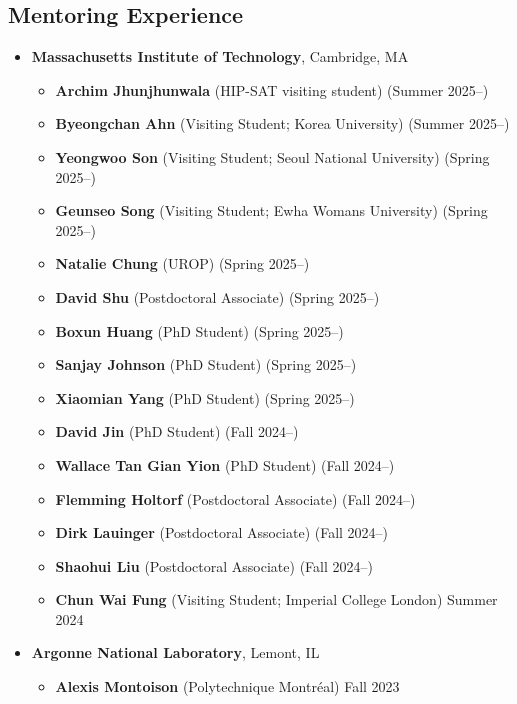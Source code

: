 \subsection*{Mentoring Experience}
\begin{itemize}[itemsep=1pt, parsep=0pt,leftmargin=*]
  \item[] \textbf{Massachusetts Institute of Technology}, Cambridge, MA
    \begin{itemize}[itemsep=1pt, parsep=0pt,leftmargin=*]
    \item[] \textbf{Archim Jhunjhunwala} (HIP-SAT visiting student) \hfill (Summer 2025--)
    \item[] \textbf{Byeongchan Ahn} (Visiting Student; Korea University) \hfill (Summer 2025--)
    \item[] \textbf{Yeongwoo Son} (Visiting Student; Seoul National University) \hfill (Spring 2025--)
    \item[] \textbf{Geunseo Song} (Visiting Student; Ewha Womans University) \hfill (Spring 2025--)
    \item[] \textbf{Natalie Chung} (UROP) \hfill (Spring 2025--)
    \item[] \textbf{David Shu} (Postdoctoral Associate) \hfill (Spring 2025--)
    \item[] \textbf{Boxun Huang} (PhD Student) \hfill (Spring 2025--)
    \item[] \textbf{Sanjay Johnson} (PhD Student) \hfill (Spring 2025--)
    \item[] \textbf{Xiaomian Yang} (PhD Student) \hfill (Spring 2025--)
    \item[] \textbf{David Jin} (PhD Student) \hfill (Fall 2024--)
    \item[] \textbf{Wallace Tan Gian Yion} (PhD Student) \hfill (Fall 2024--)
    \item[] \textbf{Flemming Holtorf} (Postdoctoral Associate) \hfill (Fall 2024--)
    \item[] \textbf{Dirk Lauinger} (Postdoctoral Associate) \hfill (Fall 2024--)
    \item[] \textbf{Shaohui Liu} (Postdoctoral Associate) \hfill (Fall 2024--)
    \item[] \textbf{Chun Wai Fung} (Visiting Student; Imperial College London) \hfill Summer 2024
  \end{itemize}
\item[] \textbf{Argonne National Laboratory}, Lemont, IL
  \begin{itemize}[itemsep=1pt, parsep=0pt,leftmargin=*]
  \item[] \textbf{Alexis Montoison} (Polytechnique Montr\'{e}al) \hfill Fall 2023

\end{itemize}
\end{itemize}
